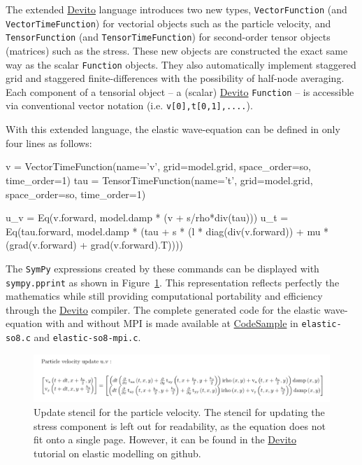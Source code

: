 \documentclass[conference]{IEEEtran}
\newenvironment{Shaded}{}{}
\newcommand{\DecValTok}[1]{\textcolor[rgb]{0.25,0.63,0.44}{{#1}}}
\newcommand{\StringTok}[1]{\textcolor[rgb]{0.25,0.44,0.63}{{#1}}}
\newcommand{\NormalTok}[1]{{#1}}
\begin{document}
The extended \href{https://github.com/devitocodes/devito}{Devito}
language introduces two new types, \texttt{VectorFunction} (and
\texttt{VectorTimeFunction}) for vectorial objects such as the particle
velocity, and \texttt{TensorFunction} (and \texttt{TensorTimeFunction})
for second-order tensor objects (matrices) such as the stress. These new
objects are constructed the exact same way as the scalar
\texttt{Function} objects. They also automatically implement staggered
grid and staggered finite-differences with the possibility of half-node
averaging. Each component of a tensorial object -- a (scalar)
\href{https://github.com/devitocodes/devito}{Devito} \texttt{Function}
-- is accessible via conventional vector notation (i.e.
\texttt{v{[}0{]},\phantom{\ }t{[}0,1{]},....}).

With this extended language, the elastic wave-equation can be defined in
only four lines as follows:

\begin{Shaded}
\begin{Highlighting}[]
\NormalTok{v = VectorTimeFunction(name=}\StringTok{'v'}\NormalTok{, grid=model.grid, space_order=so, time_order=}\DecValTok{1}\NormalTok{)}
\NormalTok{tau = TensorTimeFunction(name=}\StringTok{'t'}\NormalTok{, grid=model.grid, space_order=so, time_order=}\DecValTok{1}\NormalTok{)}

\NormalTok{u_v = Eq(v.forward, model.damp * (v + s/rho*div(tau)))}
\NormalTok{u_t = Eq(tau.forward,  model.damp *  (tau + s * (l * diag(div(v.forward)) + mu * (grad(v.forward) + grad(v.forward).T))))}
\end{Highlighting}
\end{Shaded}

The \texttt{SymPy} expressions created by these commands can be
displayed with \texttt{sympy.pprint} as shown in
Figure~\ref{PrettyElas}. This representation reflects perfectly the
mathematics while still providing computational portability and
efficiency through the
\href{https://github.com/devitocodes/devito}{Devito} compiler. The
complete generated code for the elastic wave-equation with and without
MPI is made available at
\href{https://github.com/mloubout/SC20Paper/tree/master/gencode}{CodeSample}
in \texttt{elastic-so8.c} and \texttt{elastic-so8-mpi.c}.

\begin{figure}
\centering
\includegraphics[width=1.000\hsize]{./Figures/vel_symb.png}
\caption{Update stencil for the particle velocity. The stencil for
updating the stress component is left out for readability, as the
equation does not fit onto a single page. However, it can be found in
the \href{https://github.com/devitocodes/devito}{Devito} tutorial on
elastic modelling on github.}\label{PrettyElas}
\end{figure}
\end{document}
